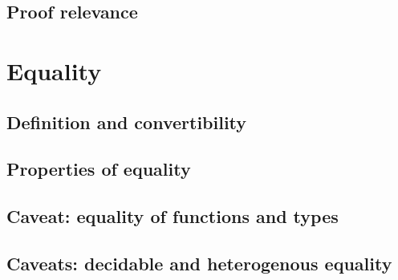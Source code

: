 \documentclass{beamer}
\begin{document}
\subsection{Proof relevance}

\section{Equality}

\subsection{Definition and convertibility}



\subsection{Properties of equality}


\subsection{Caveat: equality of functions and types}


\subsection{Caveats: decidable and heterogenous equality}
\end{document}
